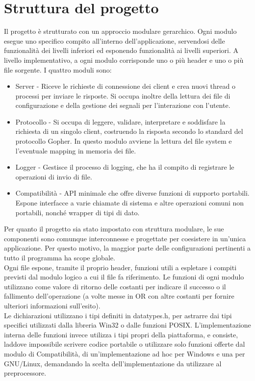 \documentclass{article}
\begin{document}
\section{Struttura del progetto}

Il progetto è strutturato con un approccio modulare gerarchico. 
Ogni modulo esegue uno specifico compito all'interno dell'applicazione, servendosi delle funzionalità
dei livelli inferiori ed esponendo funzionalità ai livelli superiori.
A livello implementativo, a ogni modulo corrisponde uno o più header e uno o più file sorgente.
I quattro moduli sono:
\begin{itemize}
    \item Server - Riceve le richieste di connessione dei client e crea nuovi thread 
    o processi per inviare le risposte. Si occupa inoltre della lettura dei file di configurazione e 
    della gestione dei segnali per l'interazione con l'utente.
    \item Protocollo - Si occupa di leggere, validare, interpretare e soddisfare la richiesta di un singolo client,
    costruendo la risposta secondo lo standard del protocollo Gopher. 
    In questo modulo avviene la lettura del file system e l'eventuale mapping 
    in memoria dei file.
    \item Logger - Gestisce il processo di logging, che ha il compito di registrare le operazioni di invio
    di file.
    \item Compatibilità - API minimale che offre diverse funzioni di supporto portabili. Espone interfacce
    a varie chiamate di sistema e altre operazioni comuni non portabili, nonché wrapper di tipi di dato.
\end{itemize} 

Per quanto il progetto sia stato impostato con struttura modulare, le sue componenti sono 
comunque interconnesse e progettate per coesistere in un'unica applicazione. 
Per questo motivo, la maggior parte delle configurazioni pertinenti a tutto il programma ha scope globale.\\
Ogni file espone, tramite il proprio header, funzioni utili a espletare
i compiti previsti dal modulo logico a cui il file fa riferimento. Le funzioni di ogni modulo
utilizzano come valore di ritorno delle costanti per indicare il successo o il fallimento dell'operazione (a volte
messe in OR con altre costanti per fornire ulteriori informazioni sull'esito).
\\Le dichiarazioni utilizzano i tipi definiti in datatypes.h, per astrarre dai tipi specifici utilizzati
dalla libreria Win32 o dalle funzioni POSIX. L'implementazione interna delle funzioni invece
 utilizza i tipi propri della piattaforma, e consiste, laddove impossibile scrivere codice portabile o utilizzare solo funzioni offerte dal 
modulo di Compatibilità, di un'implementazione ad hoc per Windows e una per GNU/Linux, demandando la scelta dell'implementazione
da utilizzare al preprocessore.
\end{document}
